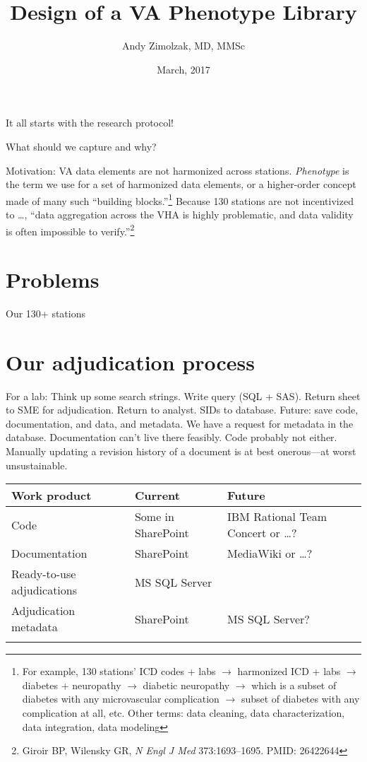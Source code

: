 \documentclass{tufte-handout}
\title{Design of a VA Phenotype Library}
\author{Andy Zimolzak, MD, MMSc}
\date{March, 2017}
\begin{document}
\maketitle

It all starts with the research protocol!

What should we capture and why?

Motivation: VA data elements are not harmonized across stations.
\emph{Phenotype} is the term we use for a set of harmonized data
elements, or a higher-order concept made of many such ``building
blocks.''\footnote{For example, 130 stations' ICD codes + labs $\to$
  harmonized ICD + labs $\to$ diabetes + neuropathy $\to$ diabetic
  neuropathy $\to$ which is a subset of diabetes with any
  microvascular complication $\to$ subset of diabetes with any
  complication at all, etc. Other terms: data cleaning, data
  characterization, data integration, data modeling} Because 130
stations are not incentivized to \ldots{}, %
``data aggregation across the
VHA is highly problematic, and data validity is often impossible to
verify.''\footnote{Giroir BP, Wilensky GR, \emph{N Engl J Med}
  373:1693--1695. PMID: 26422644}

\section{Problems}

Our 130+ stations %

\section{Our adjudication process}

For a lab: Think up some search strings. Write query (SQL + SAS). Return
sheet to SME for adjudication. Return to analyst. SIDs to database.
Future: save code, documentation, and data, and metadata. We have a
request for metadata in the database. Documentation can't live there
feasibly. Code probably not either. Manually updating a revision
history of a document is at best onerous---at worst unsustainable.

\noindent \begin{tabular}{lll}
\\
\hline
Work product & Current & Future\\
\hline
Code & Some in SharePoint & IBM Rational Team Concert or \ldots{}?\\
Documentation & SharePoint & MediaWiki or \ldots{}?\\
Ready-to-use adjudications & MS SQL Server\\
Adjudication metadata & SharePoint & MS SQL Server?\\
\hline
\\
\end{tabular}
\end{document}
